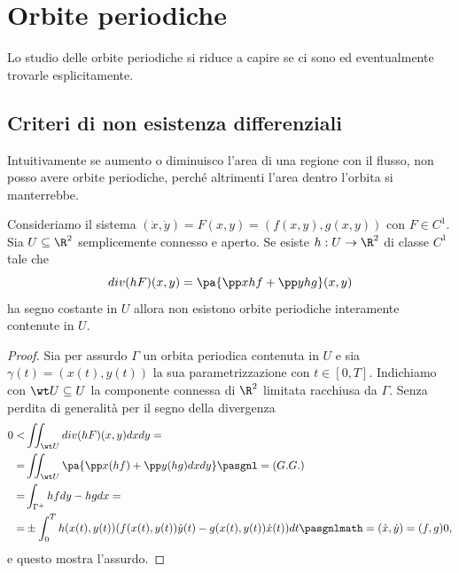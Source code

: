 \chapter{Orbite periodiche}
Lo studio delle orbite periodiche si riduce a capire se ci sono ed eventualmente trovarle esplicitamente.

\section{Criteri di non esistenza differenziali}
Intuitivamente se aumento o diminuisco l'area di una regione con il flusso, non posso avere orbite periodiche, perch\'e altrimenti l'area dentro l'orbita si manterrebbe.
\begin{proposition}\label{MetodoBendixonDulec}
Consideriamo il sistema $(\dot x,\dot y)=F(x,y)=(f(x,y),g(x,y))$ con $F\in C^1$. Sia $U\subseteq \R^2$ semplicemente connesso e aperto. Se esiste $h:U\to \R^2$ di classe $C^1$ tale che
\[div(h F)(x,y)=\pa{\pp x{h f}+\pp y{hg}}(x,y)\]
ha segno costante in $U$ allora non esistono orbite periodiche interamente contenute in $U$.
\end{proposition}
\begin{proof}
Sia per assurdo $\Gamma$ un orbita periodica contenuta in $U$ e sia $\gamma(t)=(x(t),y(t))$ la sua parametrizzazione con $t\in[0,T]$. Indichiamo con $\wt U\subseteq U$ la componente connessa di $\R^2$ limitata racchiusa da $\Gamma$. Senza perdita di generalit\`a per il segno della divergenza
\begin{align*}
0<&\iint_{\wt U}div(hF)(x,y)dxdy=\\
=&\iint_{\wt U}\pa{\pp x{}(hf)+\pp y{}(hg)dxdy}\pasgnl={(G.G.)}\\
=&\int_{\Gamma^+}hfdy-hgdx=\\
=&\pm\int_0^Th(x(t),y(t))(f(x(t),y(t))\dot y(t)-g(x(t),y(t))\dot x(t))dt\pasgnlmath={(\dot x,\dot y)=(f,g)}0,
\end{align*}
e questo mostra l'assurdo.
\end{proof}

